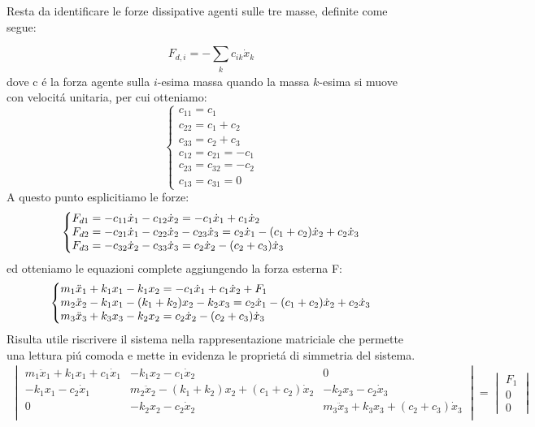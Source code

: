 \documentclass[12pt,a4paper]{article}
\makeatletter
\newenvironment{sistema}%
  {\left\lbrace\begin{array}{@{}l@{}}}%
  {\end{array}\right.}
\makeatother
\begin{document}
 		Resta da identificare le forze dissipative agenti sulle tre masse, definite come segue:
 		
		\begin{equation}
 			F_{ d,i} = - \sum_{\substack{k}} c_{ik} \dot{x}_k
 		\end{equation}
 		dove c \'e la forza agente sulla $i$-esima massa quando la massa $k$-esima si muove con velocit\'a unitaria, per cui otteniamo:
		\[
 		\begin{cases}
 		
		c_{11} = c_{1}
		\\
		c_{22} = c_{1} + c_{2}
		\\
		c_{33} = c_{2} + c_{3}
		\\
		c_{12} = c_{21} = - c_{1}
		\\
		c_{23} = c_{32} = - c_{2}
		\\
		c_{13} = c_{31} = 0
		
		\end{cases}
 		\]
		A questo punto esplicitiamo le forze:
		\[
		\begin {sistema}
		
		F_{d1} = - c_{11}\dot x_1 - c_{12}\dot x_2 = -c_1 \dot x_1 + c_1 \dot x_2
		\\
		F_{d2} = - c_{21}\dot x_1 - c_{22}\dot x_2 - c_{23}\dot x_3 = c_2  \dot x_1  - (c_1 + c_2) \dot x_2 + c_2\dot x_3
		\\
		F_{d3} = - c_{32}\dot x_2 - c_{33}\dot x_3 = c_2 \dot x_2 - (c_2 + c_3) \dot x_3
		
		\end{sistema}
		\]
 		ed otteniamo le equazioni complete aggiungendo la forza esterna F:
		\[
		\begin {sistema}
		
		m_1 \ddot{x}_1 + k_1x_1 - k_1 x_2  =  -c_1 \dot x_1 + c_1 \dot x_2 +F_1
		\\
		m_2 \ddot{x}_2 - k_1 x_1 - (k_1 +k_2 )x_2 - k_2 x_3 = c_2  \dot x_1  - (c_1 + c_2) \dot x_2 + c_2\dot x_3
		\\
		m_3 \ddot{x}_3 + k_3 x_3 -k_2 x_2= c_2 \dot x_2 - (c_2 + c_3) \dot x_3
		
		\end{sistema}
		\]
		Risulta utile riscrivere il sistema nella rappresentazione matriciale che permette una lettura pi\'u comoda e mette in evidenza le propriet\'a di simmetria del sistema.
		\begin {gather}
		\begin{vmatrix}
		m_1 \ddot{x}_1 + k_1x_1	+ c_1 \dot x_1	&  		- k_1 x_2	- c_1 \dot x_2 		&	0 \\
		- k_1 x_1 - c_2  \dot x_1 				&  	m_2 \ddot{x}_2	- (k_1 +k_2 )x_2 +(c_1 + c_2) \dot x_2	&	- k_2 x_3 - c_2\dot x_3 \\
		0	&  	-k_2 x_2 - c_2 \dot x_2		&m_3 \ddot{x}_3 + k_3 x_3 +(c_2 + c_3) \dot x_3	 \\
		\end{vmatrix}
		=
		\begin{vmatrix}
		F_1
		\\
		0
		\\
		0
		\end{vmatrix}
		\end{gather}
\end{document}
